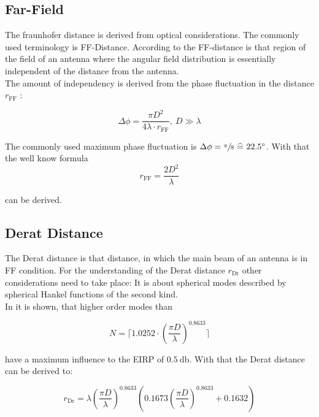 \subsection{Far-Field}

The fraunhofer distance is derived from optical considerations. The commonly used terminology is \acf{FF}-Distance. According to \cite{balanis} the \ac{FF}-distance is \glqq that region of the field of an antenna where the angular field distribution is essentially independent of the distance from the antenna.\grqq \\
The amount of independency is derived from the phase fluctuation in the distance $r_{\text{FF}}$ \cite{19510}:

\begin{equation}
\Delta\phi = \frac{\pi D^2}{4\lambda\cdot r_{\text{FF}}} ,\ D\gg\lambda 
\end{equation}

The commonly used maximum phase fluctuation is $\Delta\phi = \sfrac{\pi}{8} \ \widehat{=}\  22.5^\circ$. With that the well know formula
\begin{equation}
r_{\text{FF}} = \frac{2D^2}{\lambda}
\end{equation}

can be derived.

\subsection{Derat Distance}

The Derat distance is that distance, in which the main beam of an antenna is in \ac{FF} condition. For the understanding of the Derat distance $r_{\text{Dr}}$ other considerations need to take place: It is about spherical modes described by spherical Hankel functions  of the second kind. \cite{8393926} \cite{hansen}\\
In \cite{8393926} it is shown, that higher order modes than 

\begin{equation}
N = \lceil 1.0252\cdot\left(\frac{\pi D}{\lambda}\right)^{0.8633} \rceil
\end{equation}

have a maximum influence to the \ac{EIRP} of $\SI{0.5}{\decibel}$. With that the Derat distance can be derived to:

\begin{equation}
r_{\text{Dr}} = \lambda\left(\frac{\pi D}{\lambda}\right)^{0.8633}\left(0.1673\left(\frac{\pi D}{\lambda}\right)^{0.8633}+0.1632\right)
\end{equation}

